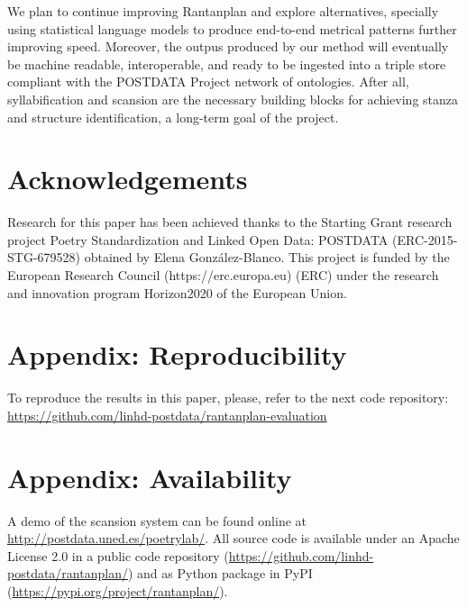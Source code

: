 \documentclass[a4paper,11pt,twocolumn,twoside]{article}
\begin{document}
We plan to continue improving Rantanplan and explore alternatives, specially using statistical language models to produce end-to-end metrical patterns further improving speed. Moreover, the outpus produced by our method will eventually be machine readable, interoperable, and ready to be ingested into a triple store compliant with the POSTDATA Project network of ontologies. After all, syllabification and scansion are the necessary building blocks for achieving stanza and structure identification, a long-term goal of the project.

\section*{Acknowledgements}
Research for this paper has been achieved thanks to the Starting Grant research project Poetry Standardization and Linked Open Data: POSTDATA (ERC-2015-STG-679528) obtained by Elena González-Blanco. This project is funded by the European Research Council (https://erc.europa.eu) (ERC) under the research and innovation program Horizon2020 of the European Union.




\appendix
\section{Appendix: Reproducibility}
To reproduce the results in this paper, please, refer to the next code repository: \url{https://github.com/linhd-postdata/rantanplan-evaluation}

\section{Appendix: Availability}
A demo of the scansion system can be found online at \url{http://postdata.uned.es/poetrylab/}. All source code is available under an Apache License 2.0 in a public code repository (\url{https://github.com/linhd-postdata/rantanplan/}) and as Python package in PyPI (\url{https://pypi.org/project/rantanplan/}).
\end{document}
